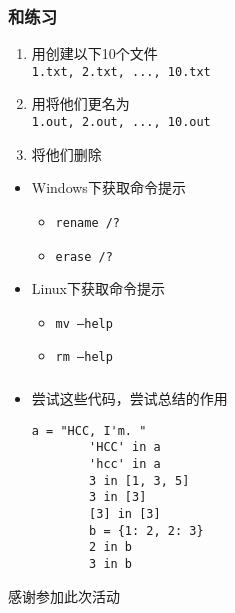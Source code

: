 \begin{CJK}{UTF8}{gbsn}
\begin{frame} [fragile]
	\frametitle{和练习}
	\begin{enumerate}
	\item 用创建以下10个文件 \\
		\texttt{1.txt, 2.txt, ..., 10.txt}
	\item 用将他们更名为 \\
		\texttt{1.out, 2.out, ..., 10.out}
	\item 将他们删除
	\end{enumerate}
	\begin{itemize}
	\item Windows下获取命令提示
		\begin{itemize}
		\item \texttt{rename /?}
		\item \texttt{erase /?}
		\end{itemize}
	\item Linux下获取命令提示
		\begin{itemize}
		\item \texttt{mv --help}
		\item \texttt{rm --help}
		\end{itemize}
	\end{itemize}
\end{frame}

\begin{frame} [fragile]
	\frametitle{}
	\linespread{1.25}
	\begin{itemize}
	\item 尝试这些代码，尝试总结的作用
		\begin{lstlisting}[style=pythonstyle, gobble=8]
		a = "HCC, I'm. "
		'HCC' in a
		'hcc' in a
		3 in [1, 3, 5]
		3 in [3]
		[3] in [3]
		b = {1: 2, 2: 3}
		2 in b
		3 in b
		\end{lstlisting}
	\end{itemize}
\end{frame}

\PreLastFrame
\begin{frame}
	\centerline{\fontsize{32}{32}\selectfont 感谢参加此次活动}
\end{frame}

\newpage
\end{CJK}


